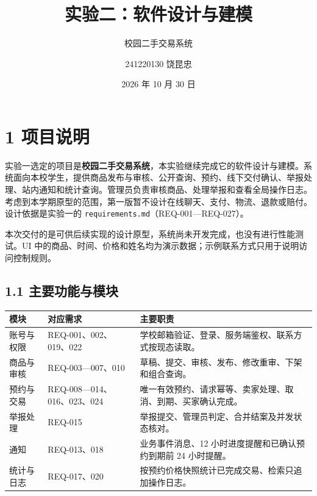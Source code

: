 \documentclass[
  chinese,
  10pt,
  a4paper,
]{article}
\title{实验二：软件设计与建模}
\subtitle{校园二手交易系统}
\author{241220130 饶昆忠}
\date{2026 年 10 月 30 日}
\newcounter{none} %
\begin{document}
\maketitle

{
\setcounter{tocdepth}{3}
\tableofcontents
}
\section{1 项目说明}\label{ux9879ux76eeux8bf4ux660e}

实验一选定的项目是\textbf{校园二手交易系统}，本实验继续完成它的软件设计与建模。系统面向本校学生，提供商品发布与审核、公开查询、预约、线下交付确认、举报处理、站内通知和统计查询。管理员负责审核商品、处理举报和查看全局操作日志。考虑到本学期原型的范围，第一版暂不设计在线聊天、支付、物流、退款或赔付。设计依据是实验一的
\texttt{requirements.md}（REQ-001---REQ-027）。

本次交付的是可供后续实现的设计原型，系统尚未开发完成，也没有进行性能测试。UI
中的商品、时间、价格和姓名均为演示数据；示例联系方式只用于说明访问控制规则。

\subsection{1.1
主要功能与模块}\label{ux4e3bux8981ux529fux80fdux4e0eux6a21ux5757}

{\def\LTcaptype{none} %
\begin{longtable}[]{@{}
  >{\raggedright\arraybackslash}p{}
  >{\raggedright\arraybackslash}p{}
  >{\raggedright\arraybackslash}p{}@{}}
\toprule\noalign{}
\begin{minipage}[b]{\linewidth}\raggedright
模块
\end{minipage} & \begin{minipage}[b]{\linewidth}\raggedright
对应需求
\end{minipage} & \begin{minipage}[b]{\linewidth}\raggedright
主要职责
\end{minipage} \\
\midrule\noalign{}
\endhead
\bottomrule\noalign{}
\endlastfoot
账号与权限 & REQ-001、002、019、022 &
学校邮箱验证、登录、服务端鉴权、联系方式按现态读取。 \\
商品与审核 & REQ-003---007、010 &
草稿、提交、审核、发布、修改重审、下架和组合查询。 \\
预约与交易 & REQ-008---014、016、023、024 &
唯一有效预约、请求幂等、卖家处理、取消、到期、买家确认完成。 \\
举报处理 & REQ-015 & 举报提交、管理员判定、合并结案及并发状态核对。 \\
通知 & REQ-013、018 & 业务事件消息、12 小时进度提醒和已确认预约到期前 24
小时提醒。 \\
统计与日志 & REQ-017、020 &
按预约价格快照统计已完成交易、检索只追加操作日志。 \\
\end{longtable}
}
\end{document}
